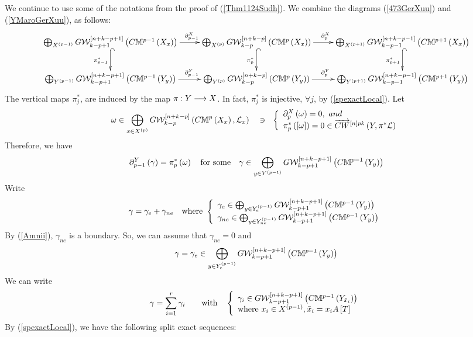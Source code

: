\documentclass[12pt]{article}
\begin{document}
\pf We continue to  use some of the notations from  the proof of  (\ref{Thm1124Sudh}). We combine the diagrams 
(\ref{473GerXuu}) and (\ref{YMaroGerXuu}), as follows:
{
$$
\diagram 
\bigoplus_{X^{\LRf{p-1}}}G{\CW}_{k-p+1}^{\LRt{n+k-p+1}}\LRf{C{\BM}^{p-1}\LRf{X_x}}
\ar[r]^{\qquad\partial_{p-1}^X} \ar@{^(->}[d]_{\pi^*_{p-1}}&
 \bigoplus_{X^{\LRf{p}}}G{\CW}_{k-p}^{\LRt{n+k-p}}\LRf{C{\BM}^{p}\LRf{X_x}} \ar[r]^{\partial_{p}^X\quad}\ar@{^(->}[d]_{\pi^*_{p}}
& \bigoplus_{X^{\LRf{p+1}}}G{\CW}_{k-p-1}^{\LRt{n+k-p-1}}\LRf{C{\BM}^{p+1}\LRf{X_x}}\ar@{^(->}[d]_{\pi^*_{p+1}}\\
\bigoplus_{Y^{\LRf{p-1}}}G{\CW}_{k-p+1}^{\LRt{n+k-p+1}}\LRf{C{\BM}^{p-1}\LRf{Y_y}}
\ar[r]^{\qquad \partial_{p-1}^Y} 
&
 \bigoplus_{Y^{\LRf{p}}}G{\CW}_{k-p}^{\LRt{n+k-p}}\LRf{C{\BM}^{p}\LRf{Y_y}} \ar[r]^{\partial_{p}^Y\quad}
&  \bigoplus_{Y^{\LRf{p+1}}}G{\CW}_{k-p-1}^{\LRt{n+k-p-1}}\LRf{C{\BM}^{p+1}\LRf{Y_y}}\\
\enddiagram 
$$
}
The vertical maps $\pi^*_{j}$,  are induced by the map $\pi: Y \lra X$. In fact, $\pi^*_j$ is injective, $\forall j$, by (\ref{spexactLocal}).  
%
Let 
$$
\omega\in \bigoplus_{x\in X^{\LRf{p}}}G{\CW}_{k-p}^{\LRt{n+k-p}}\LRf{C{\BM}^{p}\LRf{X_x}, {\CL}_x} 
\quad \ni~~
\LBrace{{l}
\partial_p^X\LRf{\omega}=0, ~ and \\
\pi^*_p\LRf{\LRt{\omega}}=0\in \ora{CW}^{\LRt{n}pk}\LRf{Y, \pi^*{\CL}}\\
}
$$
Therefore, we have 
$$
\partial_{p-1}^Y\LRf{\gamma}= \pi^*_p\LRf{\omega} \quad {\rm for ~some} \quad\gamma\in
 \bigoplus_{y\in Y^{\LRf{p-1}}} 
G{\CW}^{\LRt{n+k-p+1}}_{k-p+1}
\LRf{C{\BM}^{p-1}\LRf{Y_y}}
$$
Write 
$$
\gamma=\gamma_e +\gamma_{ne} \quad {\rm where}~ 
\LBrace{{l}
\gamma_e\in \bigoplus_{y\in Y^{\LRf{p-1}}_e} 
G{\CW}^{\LRt{n+k-p+1}}_{k-p+1}\LRf{C{\BM}^{p-1}\LRf{Y_y}}\\
\gamma_{ne}\in \bigoplus_{y\in Y^{\LRf{p-1}}_{ne}} 
G{\CW}^{\LRt{n+k-p+1}}_{k-p+1}\LRf{C{\BM}^{p-1}\LRf{Y_y}}\\
}
$$
By (\ref{Amnii}), $\gamma_{ne}$ is a boundary. So, we can assume that $\gamma_{ne}=0$ and 
$$
\gamma=\gamma_e\in  \bigoplus_{y\in Y^{\LRf{p-1}}_e} 
G{\CW}^{\LRt{n+k-p+1}}_{k-p+1}\LRf{C{\BM}^{p-1}\LRf{Y_y}}
$$
We can write 
$$
\gamma=\sum_{i=1}^r\gamma_i \qquad {\rm with} \quad 
\LBrace{{l} \gamma_i\in G{\CW}^{\LRt{n+k-p+1}}_{k-p+1}\LRf{C{\BM}^{p-1}\LRf{Y_{\tilde{x}_i}}} \\
{\rm where}~x_i\in X^{\LRf{p-1}},  \tilde{x}_i=x_iA\LRt{T} \\
}
$$
%
By (\ref{spexactLocal}), we have the following split exact sequences:
\end{document}
